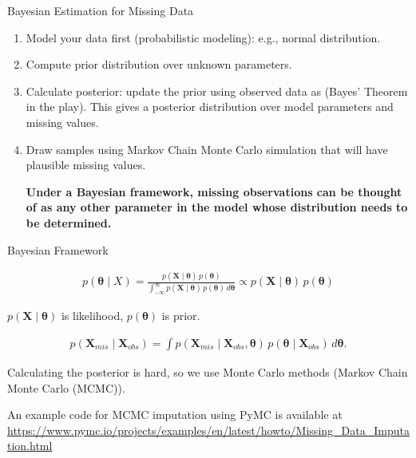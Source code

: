 \documentclass[aspectratio=169,xcolor=dvipsnames,svgnames,x11names,fleqn]{beamer}
\begin{document}
\begin{frame}{Bayesian Estimation for Missing Data}

\begin{gradbox}{}

\begin{enumerate}

\item Model your data first (probabilistic modeling): e.g., normal distribution.

\item Compute prior distribution over unknown parameters.
\item Calculate posterior: update the prior using observed data as (Bayes' Theorem in the play). This gives a posterior distribution over model parameters and missing values.
\item Draw samples using Markov Chain Monte Carlo simulation that will have plausible missing values.

\begin{center}
{\bf\color{SeaGreen4}Under a Bayesian framework, missing observations can be thought of as any other parameter in the model whose distribution needs to be determined.}
\end{center}

\end{enumerate}
\end{gradbox} 
 
\end{frame}

\begin{frame}{Bayesian Framework}

\small

\begin{tcolorbox}[title=Posterior Distribution, colframe=pink]

\begin{align*}
p(\boldsymbol{\theta} \mid X) = \frac{p(\mathbf{X} \mid \boldsymbol{\theta}) \, p(\boldsymbol{\theta})}{\int_{-\infty}^{\infty} p(\mathbf{X} \mid \boldsymbol{\theta}) \, p(\boldsymbol{\theta}) \, d\boldsymbol{\theta}}  \propto p(\mathbf{X} \mid \boldsymbol{\theta}) \, p(\boldsymbol{\theta})
\end{align*}

$p(\mathbf{X} \mid \boldsymbol{\theta})$ is likelihood, $p(\boldsymbol{\theta})$ is prior.



\end{tcolorbox}

\begin{align*}
p(\mathbf{X}_{mis} \mid \mathbf{X}_{obs}) = \int p(\mathbf{X}_{mis} \mid \mathbf{X}_{obs}, \boldsymbol{\theta}) \, p(\boldsymbol{\theta} \mid \mathbf{X}_{obs}) \, d\boldsymbol{\theta}.
\end{align*}

Calculating the posterior is hard, so we use Monte Carlo methods (Markov Chain Monte Carlo (MCMC)).

\footnotesize 

An example code for MCMC imputation using PyMC is available at {\url{https://www.pymc.io/projects/examples/en/latest/howto/Missing_Data_Imputation.html}}
\end{frame}
\end{document}
